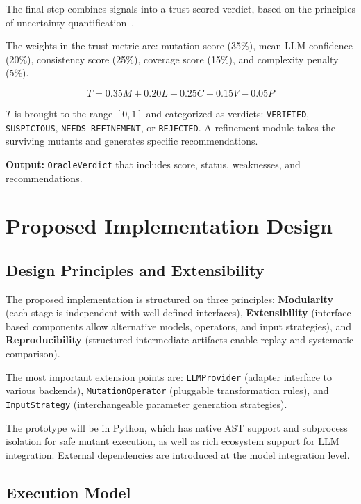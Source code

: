 \documentclass[conference]{IEEEtran}
\begin{document}
The final step combines signals into a trust-scored verdict, based on the principles of uncertainty quantification~\cite{xiong2023express_confidence,liu2024uncertainty_estimation}.

The weights in the trust metric are: mutation score (35\%), mean LLM confidence (20\%), consistency score (25\%), coverage score (15\%), and complexity penalty (5\%).

\[
T = 0.35M + 0.20L + 0.25C + 0.15V - 0.05P
\]

$T$ is brought to the range $[0, 1]$ and categorized as verdicts: \texttt{VERIFIED}, \texttt{SUSPICIOUS}, \texttt{NEEDS\_REFINEMENT}, or \texttt{REJECTED}. A refinement module takes the surviving mutants and generates specific recommendations.

\textbf{Output:} \texttt{OracleVerdict} that includes score, status, weaknesses, and recommendations.

\section{Proposed Implementation Design}

\subsection{Design Principles and Extensibility}

The proposed implementation is structured on three principles: \textbf{Modularity} (each stage is independent with well-defined interfaces), \textbf{Extensibility} (interface-based components allow alternative models, operators, and input strategies), and \textbf{Reproducibility} (structured intermediate artifacts enable replay and systematic comparison).

The most important extension points are: \texttt{LLMProvider} (adapter interface to various backends), \texttt{MutationOperator} (pluggable transformation rules), and \texttt{InputStrategy} (interchangeable parameter generation strategies).

The prototype will be in Python, which has native AST support and subprocess isolation for safe mutant execution, as well as rich ecosystem support for LLM integration. External dependencies are introduced at the model integration level.

\subsection{Execution Model}
\end{document}
